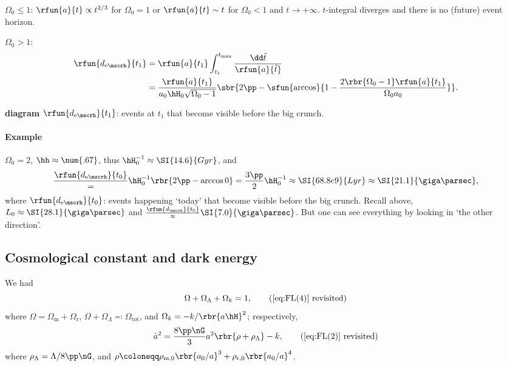 $\Omega_0 \le 1$: $\rfun{a}{t} \propto t^{2/3}$ for $\Omega_0 = 1$ or 
$\rfun{a}{t} \sim t$ for $\Omega_0 < 1$ and $t \to +\infty$. $t$-integral 
diverges and there is no (future) event horizon.

$\Omega_0 > 1$:
\begin{align}
\rfun{d_{\text{e}\mscrh}}{t_1} &= \rfun{a}{t_1}\int_{t_1}^{t_\text{max}}
\frac{\dd\tilde{t}}{\rfun{a}{\tilde{t}}} \nonumber \\
&= \frac{\rfun{a}{t_1}}{a_0\hH_0\sqrt{\Omega_0-1}}\sbr{2\pp
-\sfun{\arccos}{1-\frac{2\rbr{\Omega_0-1}\rfun{a}{t_1}}{\Omega_0 a_0}}}.
\end{align}

\textbf{diagram} $\rfun{d_{\text{e}\mscrh}}{t_1}$: events at $t_1$ that become 
visible before the big crunch.

\paragraph{Example} $\Omega_0 = 2$, $\hh \approx \num{.67}$, thus $\hH_0^{-1} 
\approx \SI{14.6}{Gyr}$, and
\begin{equation}
\frac{\rfun{d_{\text{e}\mscrh}}{t_0}} = \hH_0^{-1}\rbr{2\pp-\arccos 0} = 
\frac{3\pp}{2}\hH_0^{-1} \approx \SI{68.8e9}{Lyr}\approx\SI{21.1}{\giga\parsec},
\end{equation}
where $\rfun{d_{\text{e}\mscrh}}{t_0}$: events happening `today' that 
become visible before the big crunch. Recall above, $L_0 \approx 
\SI{28.1}{\giga\parsec}$ and $\frac{\rfun{d_{\mscrh}}{t_0}} \approx 
\SI{7.0}{\giga\parsec}$. But one can see everything by looking in `the other 
direction'.


\subsection{Cosmological constant and dark energy}
\label{ssec:12.9}

We had
\begin{equation}
\Omega + \Omega_\Lambda + \Omega_k = 1,
\tag{\ref{eq:FL(4)} revisited}
\end{equation}
where $\Omega = \Omega_\text{m} + \Omega_\text{r}$, $\Omega + \Omega_\Lambda 
\eqqcolon \Omega_\text{tot}$, and $\Omega_k = -k/\rbr{a\hH}^2$; respectively,
\begin{equation}
\dot{a}^2 = \frac{8\pp\nG}{3}a^2\rbr{\rho+\rho_\Lambda} - k,
\tag{\ref{eq:FL(2)} revisited}
\end{equation}
where $\rho_\Lambda = \Lambda/8\pp\nG$, and $\rho \coloneqq 
\rho_{\text{m},0}\rbr{a_0/a}^3 + \rho_{\text{r},0}\rbr{a_0/a}^4$.


